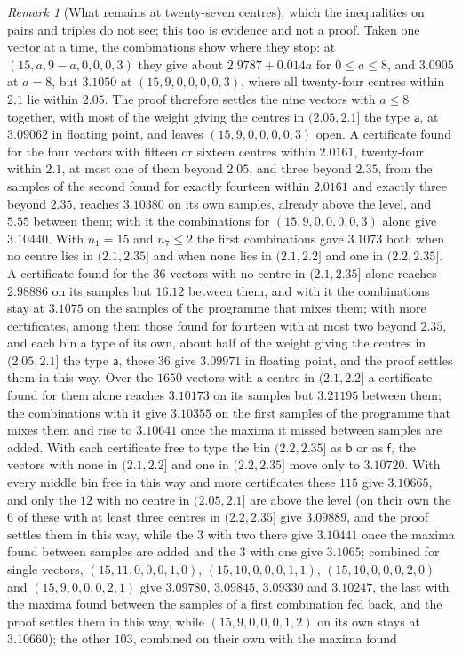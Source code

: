 \documentclass[11pt,reqno]{amsart}
\renewcommand{\_}{\origunderscore\allowbreak}
\numberwithin{equation}{section}
\theoremstyle{plain}
\theoremstyle{definition}
\theoremstyle{remark}
\newtheorem{remark}[thm]{Remark}
\begin{document}
\begin{remark}[What remains at twenty-seven centres]
which the inequalities on pairs and triples do not see; this too is
evidence and not a proof. Taken one vector at a time, the combinations show
where they stop: at $(15,a,9-a,0,0,0,3)$ they give about $2.9787+0.014a$
for $0\le a\le8$, and $3.0905$ at $a=8$, but $3.1050$ at
$(15,9,0,0,0,0,3)$, where all twenty-four centres within $2.1$ lie within
$2.05$. The proof therefore settles the nine vectors with $a\le8$
together, with most of the weight giving the centres in $(2.05,2.1]$ the
type $\mathsf a$, at $3.09062$ in floating point, and leaves
$(15,9,0,0,0,0,3)$ open. A certificate found for the four vectors with
fifteen or sixteen centres within $2.0161$, twenty-four within $2.1$, at
most one of them beyond $2.05$, and three beyond $2.35$, from the samples
of the second found for exactly fourteen within $2.0161$ and exactly three
beyond $2.35$, reaches $3.10380$ on its own samples, already above the
level, and $5.55$ between them; with it the combinations for
$(15,9,0,0,0,0,3)$ alone give $3.10440$. With $n_1=15$ and $n_7\le2$ the
first combinations gave $3.1073$ both when no centre lies in $(2.1,2.35]$ and when none lies in
$(2.1,2.2]$ and one in $(2.2,2.35]$. A certificate found for the $36$
vectors with no centre in $(2.1,2.35]$ alone reaches $2.98886$ on its
samples but $16.12$ between them, and with it the combinations stay at
$3.1075$ on the samples of the programme that mixes them; with more
certificates, among them those found for fourteen with at most two beyond
$2.35$, and each bin a type of its own, about half of the weight giving the centres in
$(2.05,2.1]$ the type $\mathsf a$, these $36$ give $3.09971$ in floating
point, and the proof settles them in this way. Over the $1650$ vectors with a centre
in $(2.1,2.2]$ a certificate found for them alone reaches $3.10173$ on its
samples but $3.21195$ between them; the combinations with it give $3.10355$
on the first samples of the programme that mixes them and rise to $3.10641$
once the maxima it missed between samples are added. With each
certificate free to type the bin $(2.2,2.35]$ as $\mathsf b$ or as $\mathsf f$, the vectors
with none in $(2.1,2.2]$ and one in $(2.2,2.35]$ move only to $3.10720$.
With every middle bin free in this way and more certificates these $115$
give $3.10665$, and only the $12$ with no centre in $(2.05,2.1]$ are above
the level (on their own the $6$ of these with at least three centres in
$(2.2,2.35]$ give $3.09889$, and the proof settles them in this way, while
the $3$ with two there give $3.10441$ once the maxima found between samples are added and the $3$ with one give $3.1065$; combined for single vectors, $(15,11,0,0,0,1,0)$, $(15,10,0,0,0,1,1)$, $(15,10,0,0,0,2,0)$ and $(15,9,0,0,0,2,1)$ give $3.09780$, $3.09845$, $3.09330$ and $3.10247$, the last with the maxima found between the samples of a first combination fed back, and the proof settles them in this way, while $(15,9,0,0,0,1,2)$ on its own stays at $3.10660$); the other $103$, combined on their own with the maxima found

\end{remark}
\end{document}
